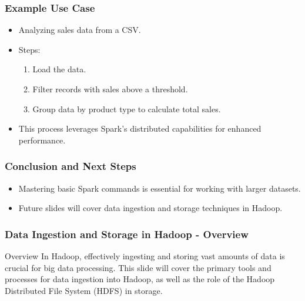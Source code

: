 \documentclass[aspectratio=169]{beamer}
\begin{document}
\begin{frame}
    \frametitle{Example Use Case}
    \begin{itemize}
        \item Analyzing sales data from a CSV.
        \item Steps:
        \begin{enumerate}
            \item Load the data.
            \item Filter records with sales above a threshold.
            \item Group data by product type to calculate total sales.
        \end{enumerate}
        \item This process leverages Spark's distributed capabilities for enhanced performance.
    \end{itemize}
\end{frame}

\begin{frame}
    \frametitle{Conclusion and Next Steps}
    \begin{itemize}
        \item Mastering basic Spark commands is essential for working with larger datasets.
        \item Future slides will cover data ingestion and storage techniques in Hadoop.
    \end{itemize}
\end{frame}

\begin{frame}[fragile]
    \frametitle{Data Ingestion and Storage in Hadoop - Overview}
    \begin{block}{Overview}
        In Hadoop, effectively ingesting and storing vast amounts of data is crucial for big data processing. 
        This slide will cover the primary tools and processes for data ingestion into Hadoop, as well as the role of the Hadoop Distributed File System (HDFS) in storage.
    \end{block}
\end{frame}
\end{document}
